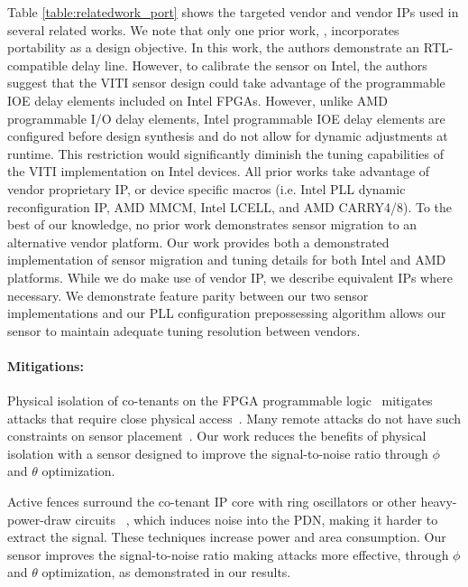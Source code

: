 Table \ref{table:relatedwork_port} shows the targeted vendor and vendor IPs used in several related works. We note that only one prior work, \cite{udugama2022viti}, incorporates \sensor portability as a design objective. In this work, the authors demonstrate an RTL-compatible delay line. However, to calibrate the sensor on Intel, the authors suggest that the VITI sensor design could take advantage of the programmable IOE delay elements included on Intel FPGAs. However, unlike AMD programmable I/O delay elements, Intel programmable IOE delay elements are configured before design synthesis and do not allow for dynamic adjustments at runtime. This restriction would significantly diminish the tuning capabilities of the VITI implementation on Intel devices. All prior works take advantage of vendor proprietary IP, or device specific macros (i.e. Intel PLL dynamic reconfiguration IP, AMD MMCM, Intel LCELL, and AMD CARRY4/8). To the best of our knowledge, no prior work demonstrates sensor migration to an alternative vendor platform. Our work provides both a demonstrated implementation of sensor migration and tuning details for both Intel and AMD platforms. While we do make use of vendor IP, we describe equivalent IPs where necessary. We demonstrate feature parity between our two sensor implementations and our PLL configuration prepossessing algorithm allows our sensor to maintain adequate tuning resolution between vendors.

\paragraph{\textbf{Mitigations: }}
Physical isolation of co-tenants on the FPGA programmable logic~\cite{huffmire2007moats, mclean2007fpga} mitigates attacks that require close physical access~\cite{giechaskiel2018leaky, ramesh2018fpga}. 
Many remote attacks do not have such constraints on sensor placement~\cite{zhao2018fpga, schellenberg2018inside}. 
Our work reduces the benefits of physical isolation with a sensor designed to improve the signal-to-noise ratio through $\phi$ and $\theta$ optimization.

Active fences surround the co-tenant IP core with ring oscillators or other heavy-power-draw circuits ~\cite{krautter2019active}, which induces noise into the PDN, making it harder to extract the signal. These techniques increase power and area consumption. 
Our sensor improves the signal-to-noise ratio making attacks more effective, through $\phi$ and $\theta$ optimization, as demonstrated in our results.


